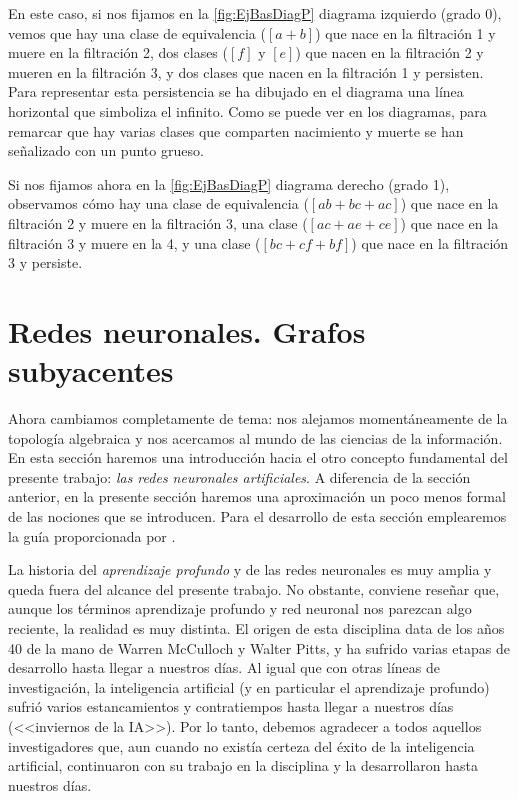 \documentclass[12pt, a4paper, twoside]{book}
\numberwithin{equation}{section}
\theoremstyle{definition}
\newenvironment{ejem}
  {\pushQED{\qed}\renewcommand{\qedsymbol}{$\blacktriangleleft$}\ejemplo}
  {\popQED\endejemplo}
\theoremstyle{remark}
\theoremstyle{plain}
\begin{document}
\begin{ejem}
	En este caso, si nos fijamos en la \autoref{fig:EjBasDiagP} 
	diagrama izquierdo (grado 0), vemos
	que hay una clase de equivalencia ($[a+b]$) que nace en la 
	filtración 1 y muere en la filtración 2, dos clases ($[f]$ y $[e]$) 
	que 
	nacen en la filtración 2 y mueren en la filtración 3, y dos clases que
	nacen en la filtración 1 y persisten. Para representar esta 
	persistencia se ha dibujado en el diagrama una línea horizontal que 
	simboliza el infinito. Como se puede ver en los diagramas, para 
	remarcar que hay varias clases que comparten nacimiento y muerte se 
	han señalizado con un punto grueso.

	Si nos fijamos ahora en la \autoref{fig:EjBasDiagP} diagrama 
	derecho (grado 1), observamos cómo
	hay una clase de equivalencia ($[ab+bc+ac]$) que nace en la filtración 
	2
	y muere en la filtración 3, una clase ($[ac+ae+ce]$) que nace en la 
	filtración 3 y muere en la 4, y una clase ($[bc+cf+bf]$) que nace en 
	la 
	filtración 3 y persiste.
	\end{ejem}

	\section{Redes neuronales. Grafos subyacentes}
	
	Ahora cambiamos completamente de tema: nos alejamos momentáneamente de 
	la topología algebraica y nos acercamos al mundo 
	de las ciencias de la información. En esta sección haremos una
	introducción hacia el otro concepto fundamental del presente trabajo: 
	\emph{las redes neuronales artificiales}. A diferencia de la sección 
	anterior, en la presente sección haremos una aproximación un poco menos 
	formal de las nociones que se introducen. Para el desarrollo de esta 
	sección emplearemos la guía proporcionada por 
	\cite{Goodfellow-et-al-2016,IA-Jonathan,MDiscreta-Guti}.

	La historia del \emph{aprendizaje profundo} y de las redes neuronales 
	es muy amplia y queda fuera del alcance del presente trabajo. No 
	obstante, conviene reseñar que, aunque los términos aprendizaje 
	profundo y red neuronal nos parezcan algo reciente, la realidad es muy
	distinta. El origen de esta disciplina data de los años 40 de la mano
	de Warren McCulloch y Walter Pitts, y ha sufrido varias etapas de 
	desarrollo hasta 
	llegar a nuestros días. Al igual que con otras líneas de 
	investigación, la inteligencia artificial (y en particular el 
	aprendizaje profundo) sufrió varios estancamientos y contratiempos 
	hasta llegar a nuestros días (<<inviernos de la IA>>). Por lo tanto, 
	debemos agradecer a todos aquellos investigadores que, aun cuando no 
	existía certeza del éxito de la inteligencia artificial, continuaron 
	con su trabajo en la disciplina y la desarrollaron hasta nuestros 
	días.
\end{document}

